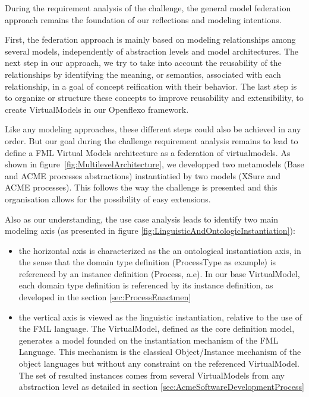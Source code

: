 
During the requirement analysis of the challenge, the general model federation approach remains the foundation of our reflections and modeling intentions. 

First, the federation approach is mainly based on modeling relationships among several models, independently of abstraction levels and model architectures.
The next step in our approach, we try to take into account the reusability of the relationships by identifying the meaning, or semantics, associated with each relationship, in a goal of concept reification with their behavior. The last step is to organize or structure these concepts to improve reusability and extensibility, to create VirtualModels in our Openflexo framework.     

Like any modeling approaches, these different steps could also be achieved in any order. But our goal during the challenge requirement analysis remains to lead to define a FML Virtual Models architecture as a federation of virtualmodels. As shown in figure~\ref{fig:MultilevelArchitecture}, we developped two metamodels (Base and ACME processes abstractions) instantiatied by two models (XSure and ACME processes). This follows the way the challenge is presented and this organisation allows for the possibility of easy extensions.

Also as our understanding, the use case analysis leads to identify two main modeling axis (as presented in figure \ref{fig:LinguisticAndOntologicInstantiation}):
\begin{itemize}
    \item the horizontal axis is characterized as the an ontological instantiation axis, in the sense that the domain type definition (ProcessType as example) is referenced by an instance definition (Process, a.e). In our base  VirtualModel, each domain type definition is referenced by its instance definition, as developed in the section \ref{sec:ProcessEnactmen}

\item the vertical axis is viewed as the linguistic instantiation, relative to the use of the FML language. The VirtualModel, defined as the core definition model, generates a model founded on the instantiation mechanism of the FML Language. This mechanism is the classical Object/Instance mechanism of the object languages but without any constraint on the referenced VirtualModel. The set of resulted instances comes from several VirtualModels 
from any abstraction level as detailed in section \ref{sec:AcmeSoftwareDevelopmentProcess}


\end{itemize}

